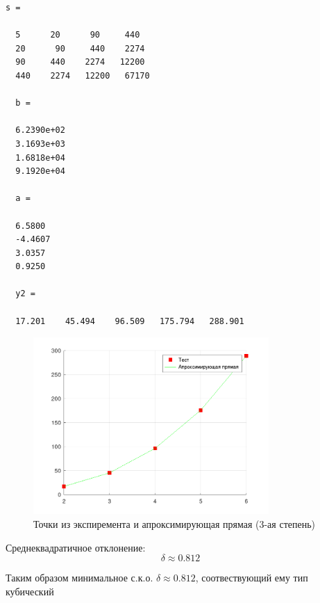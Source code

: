 \begin{lstlisting}[backgroundcolor=\color{cyan}]
  s =

  5      20      90     440
  20      90     440    2274
  90     440    2274   12200
  440    2274   12200   67170

  b =

  6.2390e+02
  3.1693e+03
  1.6818e+04
  9.1920e+04

  a =

  6.5800
  -4.4607
  3.0357
  0.9250

  y2 =

  17.201    45.494    96.509   175.794   288.901
\end{lstlisting}
\begin{figure}[H]
  \caption{Точки из экспиремента и апроксимирующая прямая (3-ая степень)}
  \label{fig:plot_7_3}
  \centering
  \includegraphics[width=0.8\textwidth]{images/task_7_3.png}
\end{figure}
Среднеквадратичное отклонение:
\[
  \delta \approx 0.812
\]

Таким образом минимальное с.к.о. $\delta \approx 0.812$, соотвествующий ему тип кубический
